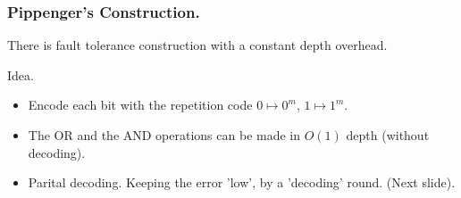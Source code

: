 \documentclass{beamer}
\begin{document}
\begin{frame}
  \frametitle{Pippenger's Construction.} 
  
  \begin{theorem}
    There is fault tolerance construction with a constant depth overhead.
  \end{theorem}
  \begin{block}{Idea.}
    \begin{itemize}
      \item Encode each bit with the repetition code $0 \mapsto 0^{m}$, $1 \mapsto 1^{m}$.
      \item The OR and the AND operations can be made in $O(1)$ depth (without decoding).
      \item Parital decoding. Keeping the error 'low', by a 'decoding' round. (Next slide).
    \end{itemize}
\end{block}
\end{frame}
\end{document}
